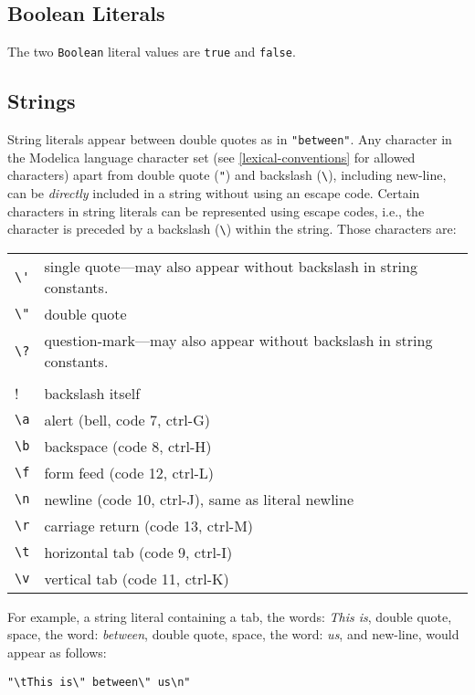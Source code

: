 \subsection{Boolean Literals}\label{boolean-literals}

The two \lstinline!Boolean! literal values are \lstinline!true! and \lstinline!false!.

\subsection{Strings}\label{strings}

String literals appear between double quotes as in \lstinline!"between"!. Any
character in the Modelica language character set (see \cref{lexical-conventions} for
allowed characters) apart from double quote (\lstinline!"!) and backslash
(\lstinline!\!), including new-line, can be \emph{directly} included
in a string without using an escape code. Certain characters in string
literals can be represented using escape codes, i.e., the character is
preceded by a backslash (\lstinline!\!) within the string. Those
characters are:
\begin{longtable}[c]{@{}ll@{}}
\lstinline!\'! & single quote---may also appear without backslash in string constants.\\
\lstinline!\"! & double quote\\
\lstinline!\?! & question-mark---may also appear without backslash in string constants.\\
\lstinline!\\! & backslash itself\\
\lstinline!\a! & alert (bell, code 7, ctrl-G)\\
\lstinline!\b! & backspace (code 8, ctrl-H)\\
\lstinline!\f! & form feed (code 12, ctrl-L)\\
\lstinline!\n! & newline (code 10, ctrl-J), same as literal newline\\
\lstinline!\r! & carriage return (code 13, ctrl-M)\\
\lstinline!\t! & horizontal tab (code 9, ctrl-I)\\
\lstinline!\v! & vertical tab (code 11, ctrl-K)\\
\end{longtable}

For example, a string literal containing a tab, the words: \emph{This is},
double quote, space, the word: \emph{between}, double quote, space, the word:
\emph{us}, and new-line, would appear as follows:
\begin{lstlisting}[language=modelica]
"\tThis is\" between\" us\n"
\end{lstlisting}

